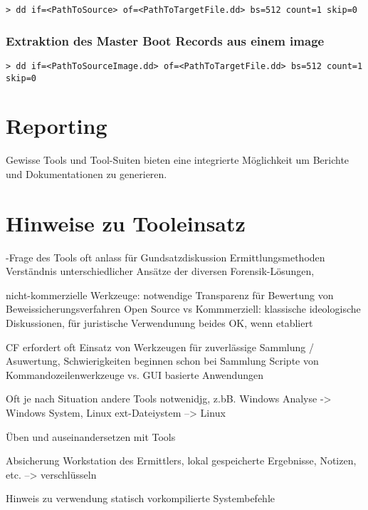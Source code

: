 \begin{lstlisting}
> dd if=<PathToSource> of=<PathToTargetFile.dd> bs=512 count=1 skip=0
\end{lstlisting}


\subsubsection{Extraktion des Master Boot Records aus einem image}
\begin{lstlisting}
> dd if=<PathToSourceImage.dd> of=<PathToTargetFile.dd> bs=512 count=1 skip=0
\end{lstlisting}



\section{Reporting}
Gewisse Tools und Tool-Suiten bieten eine integrierte Möglichkeit um Berichte und Dokumentationen zu generieren. 


\section{Hinweise zu Tooleinsatz}
-Frage des Tools oft anlass für Gundsatzdiskussion Ermittlungsmethoden
Verständnis unterschiedlicher Ansätze der diversen Forensik-Lösungen, 

nicht-kommerzielle Werkzeuge: notwendige Transparenz für Bewertung von Beweissicherungsverfahren
Open Source vs Kommmerziell: klassische ideologische Diskussionen, für juristische Verwendunung beides OK, wenn etabliert

CF erfordert oft Einsatz von Werkzeugen für zuverlässige Sammlung / Asuwertung, Schwierigkeiten beginnen schon bei Sammlung Scripte von Kommandozeilenwerkzeuge vs. GUI basierte Anwendungen

Oft je nach Situation andere Tools notwenidjg, z.bB. Windows Analyse -> Windows System, Linux ext-Dateiystem --> Linux

Üben und auseinandersetzen mit Tools

Absicherung Workstation des Ermittlers, lokal gespeicherte Ergebnisse, Notizen, etc. --> verschlüsseln

Hinweis zu verwendung statisch vorkompilierte Systembefehle

